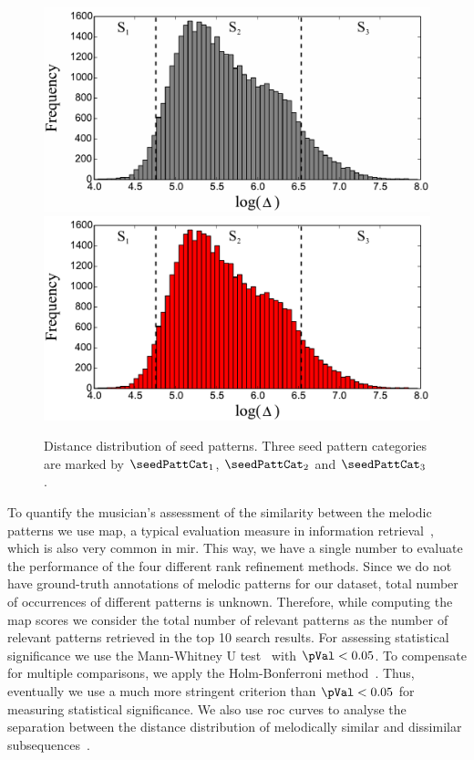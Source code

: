 \begin{figure}
	\begin{center}
		\ifdefined\PRINTVER
			\includegraphics[width=\figSizeEightyFive]{ch06_patterns/figures/discovery/SeedDistribution_BW.pdf}
		\else
			\includegraphics[width=\figSizeEightyFive]{ch06_patterns/figures/discovery/SeedDistribution.pdf}
		\fi
	\end{center}
	\caption[Distance distribution of seed melodic patterns]{Distance distribution of seed patterns. Three seed pattern categories are marked by $\seedPattCat_1$, $\seedPattCat_2$ and $\seedPattCat_3$.}
	\label{fig:SeedPatternsDistanceDistribution}
\end{figure}


To quantify the musician's assessment of the similarity between the melodic patterns we use \gls{map}, a typical evaluation measure in information retrieval~\citep{manning2008introduction}, which is also very common in \gls{mir}. This way, we have a single number to evaluate the performance of the four different rank refinement methods. Since we do not have ground-truth annotations of melodic patterns for our dataset, total number of occurrences of different patterns is unknown. Therefore, while computing the \gls{map} scores we consider the total number of relevant patterns as the number of relevant patterns retrieved in the top 10 search results. For assessing statistical significance we use the Mann-Whitney U test~\citep{mann1947test} with $\pVal < 0.05$. To compensate for multiple comparisons, we apply the Holm-Bonferroni method~\citep{holm1979simple}. Thus, eventually we use a much more stringent criterion than $\pVal < 0.05$ for measuring statistical significance. We also use \acrshort{roc} curves to analyse the separation between the distance distribution of melodically similar and dissimilar subsequences~\citep{manning2008introduction}. 


